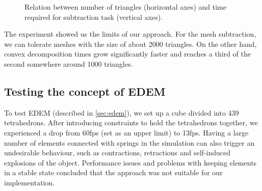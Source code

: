 \begin{figure}
\centering
{}
\caption{Relation between number of triangles (horizontal axes) and time required for subtraction task (vertical axes).}
\label{fig:triangletimes}
\end{figure}




The experiment showed us the limits of our approach. For the mesh subtraction, we can tolerate meshes with the size of about 2000 triangles.  On the other hand, convex decomposition times grow significantly faster and reaches a third of the second somewhere around 1000 triangles.


\subsection{Testing the concept of EDEM}
To test EDEM (described in \cref{sec:edem}), we set up a cube divided into 439 tetrahedrons. After introducing constraints to hold the tetrahedrons together, we experienced a drop from 60fps (set as an upper limit) to 13fps. Having a large number of elements connected with springs in the simulation can also trigger an undesirable behaviour, such as contractions, retractions and self-induced explosions of the object. Performance issues and problems with keeping elements in a stable state concluded that the approach was not suitable for our implementation.




